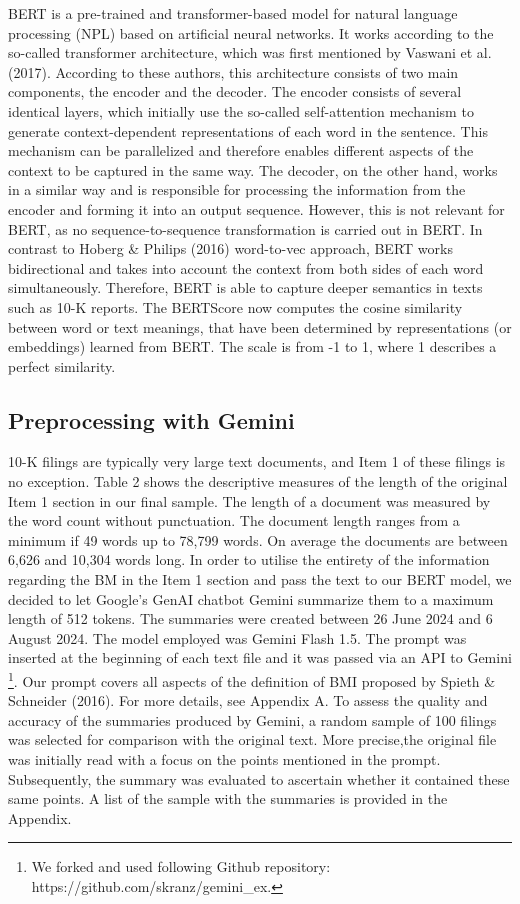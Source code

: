 \documentclass[
]{article}
\begin{document}
BERT is a pre-trained and transformer-based model for natural language
processing (NPL) based on artificial neural networks. It works according
to the so-called transformer architecture, which was first mentioned by
Vaswani et al. (2017). According to these authors, this architecture
consists of two main components, the encoder and the decoder. The
encoder consists of several identical layers, which initially use the
so-called self-attention mechanism to generate context-dependent
representations of each word in the sentence. This mechanism can be
parallelized and therefore enables different aspects of the context to
be captured in the same way. The decoder, on the other hand, works in a
similar way and is responsible for processing the information from the
encoder and forming it into an output sequence. However, this is not
relevant for BERT, as no sequence-to-sequence transformation is carried
out in BERT. In contrast to Hoberg \& Philips (2016) word-to-vec
approach, BERT works bidirectional and takes into account the context
from both sides of each word simultaneously. Therefore, BERT is able to
capture deeper semantics in texts such as 10-K reports. The BERTScore
now computes the cosine similarity between word or text meanings, that
have been determined by representations (or embeddings) learned from
BERT. The scale is from -1 to 1, where 1 describes a perfect similarity.

\subsection{Preprocessing with Gemini}\label{preprocessing-with-gemini}

10-K filings are typically very large text documents, and Item 1 of
these filings is no exception. Table 2 shows the descriptive measures of
the length of the original Item 1 section in our final sample. The
length of a document was measured by the word count without punctuation.
The document length ranges from a minimum if 49 words up to 78,799
words. On average the documents are between 6,626 and 10,304 words long.
In order to utilise the entirety of the information regarding the BM in
the Item 1 section and pass the text to our BERT model, we decided to
let Google's GenAI chatbot Gemini summarize them to a maximum length of
512 tokens. The summaries were created between 26 June 2024 and 6 August
2024. The model employed was Gemini Flash 1.5. The prompt was inserted
at the beginning of each text file and it was passed via an API to
Gemini \footnote{We forked and used following Github repository:
  https://github.com/skranz/gemini\_ex.}. Our prompt covers all aspects
of the definition of BMI proposed by Spieth \& Schneider (2016). For
more details, see Appendix A. To assess the quality and accuracy of the
summaries produced by Gemini, a random sample of 100 filings was
selected for comparison with the original text. More precise,the
original file was initially read with a focus on the points mentioned in
the prompt. Subsequently, the summary was evaluated to ascertain whether
it contained these same points. A list of the sample with the summaries
is provided in the Appendix.
\end{document}
